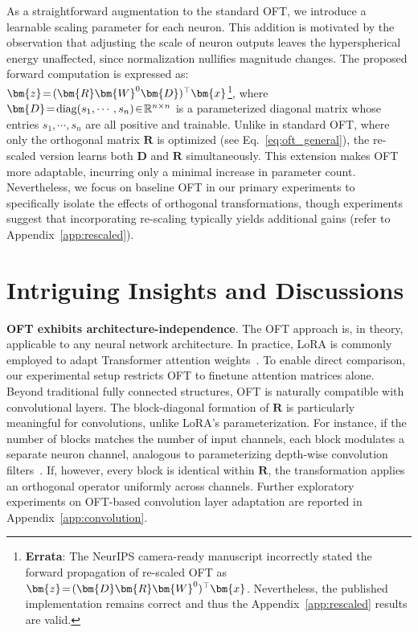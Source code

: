 {As a straightforward augmentation to the standard OFT, we introduce a learnable scaling parameter for each neuron. This addition is motivated by the observation that adjusting the scale of neuron outputs leaves the hyperspherical energy unaffected, since normalization nullifies magnitude changes. The proposed forward computation is expressed as: $\thickmuskip=2mu \medmuskip=2mu\bm{z}=(\bm{R}\bm{W}^0\bm{D})^\top\bm{x}$\footnote{\textbf{Errata}: The NeurIPS camera-ready manuscript incorrectly stated the forward propagation of re-scaled OFT as $\thickmuskip=2mu \medmuskip=2mu\bm{z}=(\bm{D}\bm{R}\bm{W}^0)^\top\bm{x}$. Nevertheless, the published implementation remains correct and thus the Appendix~\ref{app:rescaled} results are valid.}, where $\thickmuskip=2mu \medmuskip=2mu \bm{D}=\text{diag}(s_1,\cdots,s_n)\in\mathbb{R}^{n\times n}$ is a parameterized diagonal matrix whose entries $s_1,\cdots,s_n$ are all positive and trainable. Unlike in standard OFT, where only the orthogonal matrix $\bm{R}$ is optimized (see Eq.~\eqref{eq:oft_general}), the re-scaled version learns both $\bm{D}$ and $\bm{R}$ simultaneously. This extension makes OFT more adaptable, incurring only a minimal increase in parameter count. Nevertheless, we focus on baseline OFT in our primary experiments to specifically isolate the effects of orthogonal transformations, though experiments suggest that incorporating re-scaling typically yields additional gains (refer to Appendix~\ref{app:rescaled}).

\section{Intriguing Insights and Discussions}

\textbf{OFT exhibits architecture-independence}. The OFT approach is, in theory, applicable to any neural network architecture. In practice, LoRA is commonly employed to adapt Transformer attention weights~\cite{hulora2022}. To enable direct comparison, our experimental setup restricts OFT to finetune attention matrices alone. Beyond traditional fully connected structures, OFT is naturally compatible with convolutional layers. The block-diagonal formation of $\bm{R}$ is particularly meaningful for convolutions, unlike LoRA’s parameterization. For instance, if the number of blocks matches the number of input channels, each block modulates a separate neuron channel, analogous to parameterizing depth-wise convolution filters~\cite{chollet2017xception}. If, however, every block is identical within $\bm{R}$, the transformation applies an orthogonal operator uniformly across channels. Further exploratory experiments on OFT-based convolution layer adaptation are reported in Appendix~\ref{app:convolution}.

}

